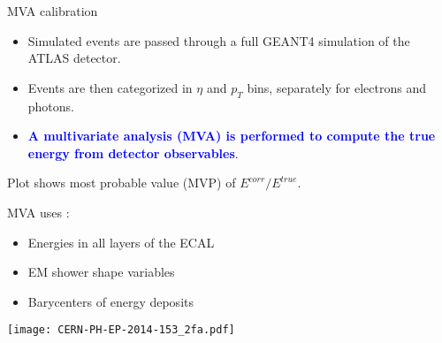 \begin{frame}{MVA calibration}
\begin{itemize}
\item Simulated events are passed through a full GEANT4 simulation of the ATLAS detector.
\item Events are then categorized in $\eta$ and $p_T$ bins, separately for electrons and photons.
\item \textcolor{blue}{\bf A multivariate analysis (MVA) is performed to compute the true energy from detector observables}.
\end{itemize}
Plot shows most probable value (MVP) of $E^{corr}/E^{true}$.
  \begin{minipage}{0.49\linewidth}
    MVA uses :
    \begin{itemize}
    \item Energies in all layers of the ECAL
    \item EM shower shape variables
    \item Barycenters of energy deposits
    \end{itemize}
  \end{minipage}
  \hfill
  \begin{minipage}{0.49\linewidth}
    \texttt{[image: CERN-PH-EP-2014-153\_2fa.pdf]}
  \end{minipage}

\end{frame}


